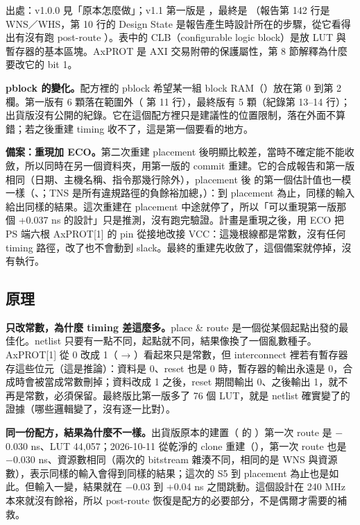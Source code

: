 出處：v1.0.0 見「原本怎麼做」；v1.1 第一版是 ，最終是 （報告第 142 行是 WNS／WHS，第 10 行的 Design State 是報告產生時設計所在的步驟，從它看得出有沒有跑 post-route ）。表中的 CLB（configurable logic block）是放 LUT 與暫存器的基本區塊。AxPROT 是 AXI 交易附帶的保護屬性，第 8 節解釋為什麼要改它的 bit 1。

\textbf{pblock 的變化。}配方裡的 pblock 希望某一組 block RAM（）放在第 0 到第 2 欄。第一版有 6 顆落在範圍外（ 第 11 行），最終版有 5 顆（紀錄第 13--14 行）；出貨版沒有公開的紀錄。它在這個配方裡只是建議性的位置限制，落在外面不算錯；若之後重建 timing 收不了，這是第一個要看的地方。

\textbf{備案：重現加 ECO。}第二次重建 placement 後明顯比較差，當時不確定能不能收斂，所以同時在另一個資料夾，用第一版的 commit 重建。它的合成報告和第一版相同（日期、主機名稱、指令那幾行除外），placement 後  的第一個估計值也一模一樣（、；TNS 是所有違規路徑的負餘裕加總，）：到 placement 為止，同樣的輸入給出同樣的結果。這次重建在 placement 中途就停了，所以「可以重現第一版那個 +0.037 ns 的設計」只是推測，沒有跑完驗證。計畫是重現之後，用 ECO 把 PS 端六根 AxPROT[1] 的 pin 從接地改接 VCC：這幾根線都是常數，沒有任何 timing 路徑，改了也不會動到 slack。最終的重建先收斂了，這個備案就停掉，沒有執行。

\subsection{原理}

\textbf{只改常數，為什麼 timing 差這麼多。}place \& route 是一個從某個起點出發的最佳化。netlist 只要有一點不同，起點就不同，結果像換了一個亂數種子。AxPROT[1] 從 0 改成 1（ → ）看起來只是常數，但 interconnect 裡若有暫存器存這些位元（這是推論）：資料是 0、reset 也是 0 時，暫存器的輸出永遠是 0，合成時會被當成常數刪掉；資料改成 1 之後，reset 期間輸出 0、之後輸出 1，就不再是常數，必須保留。最終版比第一版多了 76 個 LUT，就是 netlist 確實變了的證據（哪些邏輯變了，沒有逐一比對）。

\textbf{同一份配方，結果為什麼不一樣。}出貨版原本的建置（ 的 ）第一次 route 是 $-$0.030 ns、LUT 44,057；2026-10-11 從乾淨的 clone 重建（），第一次 route 也是 $-$0.030 ns、資源數相同（兩次的 bitstream 雜湊不同，相同的是 WNS 與資源數），表示同樣的輸入會得到同樣的結果；這次的 S5 到 placement 為止也是如此。但輸入一變，結果就在 $-$0.03 到 +0.04 ns 之間跳動。這個設計在 240 MHz 本來就沒有餘裕，所以 post-route 恢復是配方的必要部分，不是偶爾才需要的補救。

